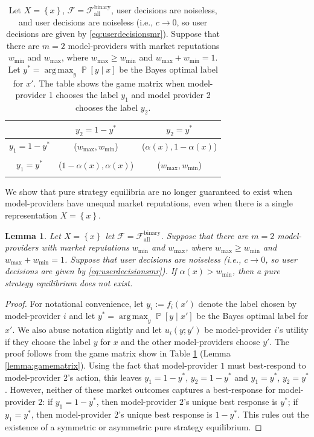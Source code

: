 \documentclass[letterpaper,11pt]{article}
\newtheorem{lemma}{Lemma}
\theoremstyle{plain}
\DeclareMathOperator*{\argmax}{arg\,max}
\DeclareMathOperator*{\Prob}{\mathbb{P}}
\begin{document}
\begin{table}[]
    \centering
    \begin{tabular}{c|c | c}
     & $y_2 = 1 - y^*$ & $y_2 = y^*$ \\
     \hline
     $y_1 = 1 - y^*$    &  ($w_{\text{max}}, w_{\text{min}}$)   &  ($\alpha(x), 1 - \alpha(x)$) \\ \\
     $y_1 = y^*$    &  ($1 - \alpha(x), \alpha(x)$)   & ($w_{\text{max}}, w_{\text{min}}$)\\
     \\
    \end{tabular}
    \caption{Let $X = \left\{x \right\}$, $\mathcal{F} = \mathcal{F}^{\text{binary}}_{\text{all}}$, user decisions are noiseless, and user decisions are noiseless (i.e., $c \rightarrow 0$, so user decisions are given by \eqref{eq:userdecisionsmr}). Suppose that there are $m=2$ model-providers with market reputations $w_{\text{min}}$ and $w_{\text{max}}$, where $w_{\text{max}} \ge w_{\text{min}}$ and $w_{\text{max}} +  w_{\text{min}} = 1$. Let $y^* =  \argmax_{y} \Prob[y \mid x]$ be the Bayes optimal label for $x'$. The table shows the game matrix when model-provider 1 chooses the label $y_1$ and model provider 2 chooses the label $y_2$.  }
    \label{tab:gamematrix}
\end{table}


We show that pure strategy equilibria are no longer guaranteed to exist when model-providers have unequal market reputations, even when there is a single representation $X = \left\{x \right\}$. 
\begin{lemma}
\label{lemma:nonexistence}
Let $X = \left\{x \right\}$ let $\mathcal{F} = \mathcal{F}^{\text{binary}}_{\text{all}}$. Suppose that there are $m=2$ model-providers with market reputations $w_{\text{min}}$ and $w_{\text{max}}$, where $w_{\text{max}} \ge w_{\text{min}}$ and $w_{\text{max}} +  w_{\text{min}} = 1$. Suppose that user decisions are noiseless (i.e., $c \rightarrow 0$, so user decisions are given by \eqref{eq:userdecisionsmr}). If $\alpha(x) > w_{\text{min}}$, then a pure strategy equilibrium does not exist. 
\end{lemma}
\begin{proof}
For notational convenience, let $y_i := f_i(x')$ denote the label chosen by model-provider $i$ and 
let $y^* =  \argmax_{y} \Prob[y \mid x']$ be the Bayes optimal label for $x'$. We also abuse notation slightly and let $u_i(y; y')$ be model-provider $i$'s utility if they choose the label $y$ for $x$ and the other model-providers choose $y'$. The proof follows from the game matrix show in Table \ref{tab:gamematrix} (Lemma \ref{lemma:gamematrix}). Using the fact that model-provider $1$ must best-respond to model-provider $2$'s action, this leaves $y_1 = 1-y^*$, $y_2 = 1-y^*$ and $y_1 = y^*$, $y_2 = y^*$. However, neither of these market outcomes captures a best-response for model-provider $2$: if $y_1 = 1 - y^*$, then model-provider $2$'s unique best response is $y^*$; if $y_1 = y^*$, then model-provider $2$'s unique best response is $1-y^*$. This rules out the existence of a symmetric or asymmetric pure strategy equilibrium. 
\end{proof}
\end{document}

